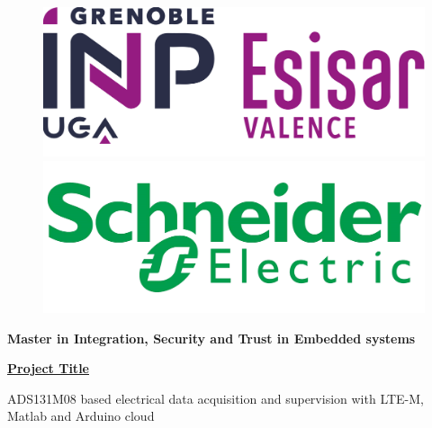 \begin{titlepage}
\renewcommand*{\thepage}{Title} %
\thispagestyle{empty}
\begin{center}
\vspace{3\baselineskip}
\begin{figure}[htbp]
\centering
\includegraphics[scale=0.05]{images/esisar_logo.png}
\hspace{7\baselineskip}
        \includegraphics[scale=0.07]{images/schneider_logo.png}
\end{figure}

\vspace{-0.5\baselineskip} 
    { \Large \bfseries {Master in Integration, Security and Trust in Embedded systems} \par} 
    \vspace{\baselineskip} 

 \vspace{\baselineskip}
 \vspace{\baselineskip}

  \vspace{\baselineskip} 

        {\large \bfseries \underline {Project Title}\par} 
\vspace{\baselineskip}
\large\bf {{ADS131M08 based electrical data acquisition and supervision with LTE-M, Matlab and Arduino cloud }\par}
    




\end{center}
\end{titlepage}
